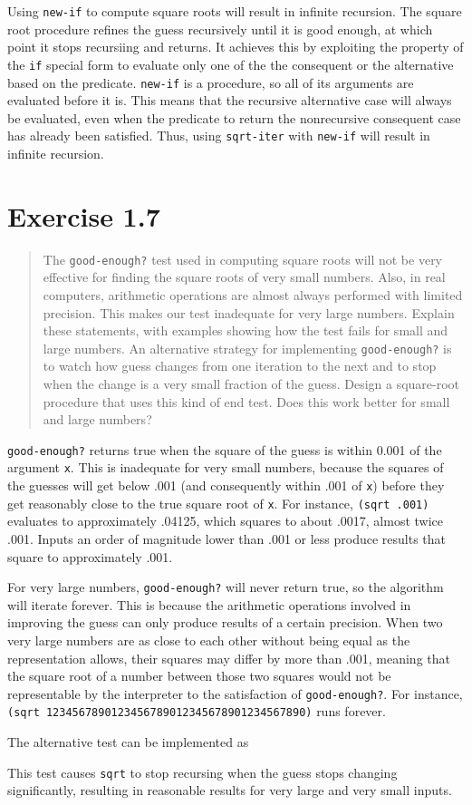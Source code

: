\documentclass{article}
\begin{document}
Using \verb|new-if| to compute square roots will result in infinite
recursion. The square root procedure refines the guess recursively until it is
good enough, at which point it stops recursiing and returns. It achieves this
by exploiting the property of the \verb|if| special form to evaluate only
one of the the consequent or the alternative based on the predicate.
\verb|new-if| is a procedure, so all of its arguments are evaluated before
it is. This means that the recursive alternative case will always be evaluated,
even when the predicate to return the nonrecursive consequent case has already
been satisfied. Thus, using \verb|sqrt-iter| with \verb|new-if| will
result in infinite recursion.

\section{Exercise 1.7}
\begin{quote}
    The \verb|good-enough?| test used in computing square roots will not be
    very effective for finding the square roots of very small numbers. Also, in
    real computers, arithmetic operations are almost always performed with
    limited precision. This makes our test inadequate for very large numbers.
    Explain these statements, with examples showing how the test fails for
    small and large numbers. An alternative strategy for implementing
    \verb|good-enough?| is to watch how guess changes from one iteration to the
    next and to stop when the change is a very small fraction of the guess.
    Design a square-root procedure that uses this kind of end test. Does this
    work better for small and large numbers?
\end{quote}

\verb|good-enough?| returns true when the square of the guess is within 0.001
of the argument \verb|x|. This is inadequate for very small numbers, because
the squares of the guesses will get below .001 (and consequently within .001 of
\verb|x|) before they get reasonably close to the true square root of \verb|x|.
For instance, \verb|(sqrt .001)| evaluates to approximately .04125, which
squares to about .0017, almost twice .001. Inputs an order of magnitude lower
than .001 or less produce results that square to approximately .001.

For very large numbers, \verb|good-enough?| will never return true, so the
algorithm will iterate forever. This is because the arithmetic operations
involved in improving the guess can only produce results of a certain
precision. When two very large numbers are as close to each other without being
equal as the representation allows, their squares may differ by more than .001,
meaning that the square root of a number between those two squares would not be
representable by the interpreter to the satisfaction of \verb|good-enough?|. For
instance, \verb|(sqrt 1234567890123456789012345678901234567890)| runs forever.

The alternative test can be implemented as


This test causes \verb|sqrt| to stop recursing when the guess stops changing
significantly, resulting in reasonable results for very large and very small
inputs.
\end{document}
